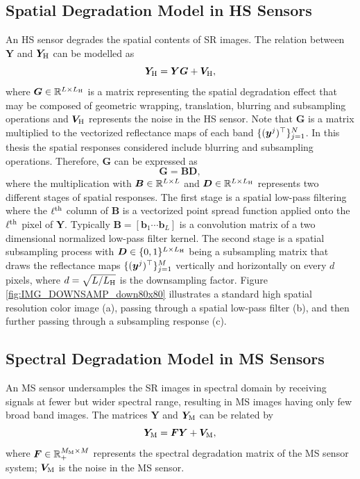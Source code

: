 \subsection{Spatial Degradation Model in HS Sensors}\label{sec:SPATIAL_DOWNSAMPL_MODEL}
An HS sensor degrades the spatial contents of SR images.
The relation between $\bm Y$ and $\bm Y_\text H$ can be modelled as
\begin{equation}
    \bm Y_\text H = \bm Y \bm G + \bm V_\text H,
    \label{eq:spatial_degradation_model}
\end{equation}
where $\bm G \in \mathbb R^{L \times L_\text H}$ is a matrix representing the spatial
degradation effect that may be composed of geometric wrapping, translation,
blurring and subsampling operations and $\bm V_\text H$ represents the noise
in the HS sensor.
Note that $\bm G$ is a matrix multiplied to the vectorized reflectance maps of
each band $\{(\bm y^j)^\top\}_{j=1}^N$.
In this thesis the spatial responses considered include blurring and
subsampling operations.
Therefore, $\bm G$ can be expressed as
\begin{equation}
    \bm G = \bm B \bm D,
    \label{eq:spatial_degradation_model_G}
\end{equation}
where the multiplication with $\bm B \in \mathbb R^{L \times L}$ and
$\bm D \in \mathbb R^{L \times L_\text H}$ represents two different stages of spatial
responses.
The first stage is a spatial low-pass filtering where the $\ell^\text{th}$ column
of $\bm B$ is a vectorized point spread function applied onto the $\ell^\text{th}$
pixel of $\bm Y$.
Typically $\bm B = [\bm b_1 \cdots \bm b_L]$ is a convolution matrix of a two
dimensional normalized low-pass filter kernel.
The second stage is a spatial subsampling process with
$\bm D \in \{0,1\}^{L \times L_\text H}$ being a subsampling matrix that draws
the reflectance maps $\{(\bm y^j)^\top\}_{j=1}^M$ vertically and horizontally on
every $d$ pixels, where $d = \sqrt{L/L_\text H}$ is the downsampling
factor.
Figure \ref{fig:IMG_DOWNSAMP_down80x80} illustrates a standard high spatial
resolution color image (a), passing through a spatial low-pass filter
(b), and then further passing through a subsampling response (c).

\subsection{Spectral Degradation Model in MS Sensors}\label{sec:SPECTRAL_DOWNSAMPL_MODEL}
An MS sensor undersamples the SR images in spectral domain by receiving signals
at fewer but wider spectral range, resulting in MS images having only few
broad band images.
The matrices $\bm Y$ and $\bm Y_\text M$ can be related by
\begin{equation}
    \bm Y_\text M = \bm F \bm Y + \bm V_\text M,
    \label{eq:spectral_degradation_model}
\end{equation}
where $\bm F \in \mathbb R_+^{M_\text M \times M}$ represents the spectral degradation
matrix of the MS sensor system; $\bm V_\text M$ is the noise in the MS sensor.

